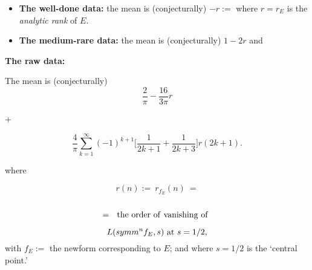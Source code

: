 \documentclass[12pt]{beamer}
\theoremstyle{definition}
\begin{document}
 \begin{frame}\vskip20pt
{\Large  \vskip20pt


    \begin{itemize}
   \item {\bf The well-done data:} the  mean is (conjecturally) $-r:=$  where $r= r_E$ is the {\it analytic rank} of $E$.  \vskip20pt

    \item {\bf The medium-rare data:} the  mean is  (conjecturally)  $1-2r$ and   \end{itemize} } \end{frame}

 \begin{frame}\vskip20pt
{\Large  \vskip20pt

      \centerline{\bf The raw data:}\vskip5pt  The  mean is  (conjecturally) $$
{\frac{2}{\pi}}- {\frac{16}{3\pi}}r$$ \vskip5pt \centerline{ + }  \vskip5pt $$ {\frac{4}{\pi}} \sum_{k=1}^{\infty}  (-1)^{k+1}\big[{\frac{1}{2k+1}} + {\frac{1}{2k+3}}\big]r({2k+1}).
$$ \centerline{  where }  } \end{frame}

 \begin{frame}\vskip20pt
{\Large  \vskip20pt $$r(n):= \ r_{f_E}(n)\ =$$ \\
$$=\ \  {\rm the\ order\ of\ vanishing\ of\ }$$

$$L(symm^nf_E, s)\ {\rm at}\ s=1/2,$$ \vskip20pt with $f_E:=$ the newform  corresponding to  $E$; and where  $s=1/2$ is the `central point.'  }
\end{frame}
\end{document}
